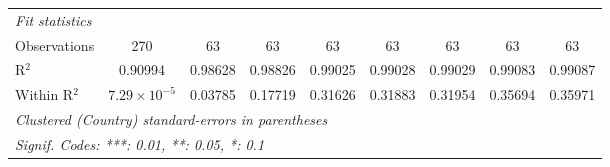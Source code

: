 \begin{table}[htbp]
\begin{tabular}{lcccccccc}
      \midrule
      \emph{Fit statistics}\\
      Observations                                                                      & 270                   & 63       & 63             & 63             & 63             & 63             & 63             & 63\\  
      R$^2$                                                                             & 0.90994               & 0.98628  & 0.98826        & 0.99025        & 0.99028        & 0.99029        & 0.99083        & 0.99087\\  
      Within R$^2$                                                                      & $7.29\times 10^{-5}$  & 0.03785  & 0.17719        & 0.31626        & 0.31883        & 0.31954        & 0.35694        & 0.35971\\  
      \midrule \midrule
      \multicolumn{9}{l}{\emph{Clustered (Country) standard-errors in parentheses}}\\
      \multicolumn{9}{l}{\emph{Signif. Codes: ***: 0.01, **: 0.05, *: 0.1}}\\
   \end{tabular}
\end{table}


